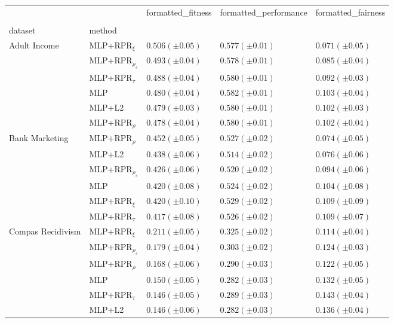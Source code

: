 \begin{tabular}{lllll}
\toprule
 &  & formatted_fitness & formatted_performance & formatted_fairness \\
 &  &  &  &  \\
dataset & method &  &  &  \\
\midrule
\multirow[t]{6}{*}{Adult Income} & MLP+RPR$_{\xi}$ & $0.506 (\pm0.05)$ & $0.577 (\pm0.01)$ & $0.071 (\pm0.05)$ \\
 & MLP+RPR$_{\rho_s}$ & $0.493 (\pm0.04)$ & $0.578 (\pm0.01)$ & $0.085 (\pm0.04)$ \\
 & MLP+RPR$_{\tau}$ & $0.488 (\pm0.04)$ & $0.580 (\pm0.01)$ & $0.092 (\pm0.03)$ \\
 & MLP & $0.480 (\pm0.04)$ & $0.582 (\pm0.01)$ & $0.103 (\pm0.04)$ \\
 & MLP+L2 & $0.479 (\pm0.03)$ & $0.580 (\pm0.01)$ & $0.102 (\pm0.03)$ \\
 & MLP+RPR$_{\rho}$ & $0.478 (\pm0.04)$ & $0.580 (\pm0.01)$ & $0.102 (\pm0.04)$ \\
\cline{1-5}
\multirow[t]{6}{*}{Bank Marketing} & MLP+RPR$_{\rho}$ & $0.452 (\pm0.05)$ & $0.527 (\pm0.02)$ & $0.074 (\pm0.05)$ \\
 & MLP+L2 & $0.438 (\pm0.06)$ & $0.514 (\pm0.02)$ & $0.076 (\pm0.06)$ \\
 & MLP+RPR$_{\rho_s}$ & $0.426 (\pm0.06)$ & $0.520 (\pm0.02)$ & $0.094 (\pm0.06)$ \\
 & MLP & $0.420 (\pm0.08)$ & $0.524 (\pm0.02)$ & $0.104 (\pm0.08)$ \\
 & MLP+RPR$_{\xi}$ & $0.420 (\pm0.10)$ & $0.529 (\pm0.02)$ & $0.109 (\pm0.09)$ \\
 & MLP+RPR$_{\tau}$ & $0.417 (\pm0.08)$ & $0.526 (\pm0.02)$ & $0.109 (\pm0.07)$ \\
\cline{1-5}
\multirow[t]{6}{*}{Compas Recidivism} & MLP+RPR$_{\xi}$ & $0.211 (\pm0.05)$ & $0.325 (\pm0.02)$ & $0.114 (\pm0.04)$ \\
 & MLP+RPR$_{\rho_s}$ & $0.179 (\pm0.04)$ & $0.303 (\pm0.02)$ & $0.124 (\pm0.03)$ \\
 & MLP+RPR$_{\rho}$ & $0.168 (\pm0.06)$ & $0.290 (\pm0.03)$ & $0.122 (\pm0.05)$ \\
 & MLP & $0.150 (\pm0.05)$ & $0.282 (\pm0.03)$ & $0.132 (\pm0.05)$ \\
 & MLP+RPR$_{\tau}$ & $0.146 (\pm0.05)$ & $0.289 (\pm0.03)$ & $0.143 (\pm0.04)$ \\
 & MLP+L2 & $0.146 (\pm0.06)$ & $0.282 (\pm0.03)$ & $0.136 (\pm0.04)$ \\
\cline{1-5}

\end{tabular}
